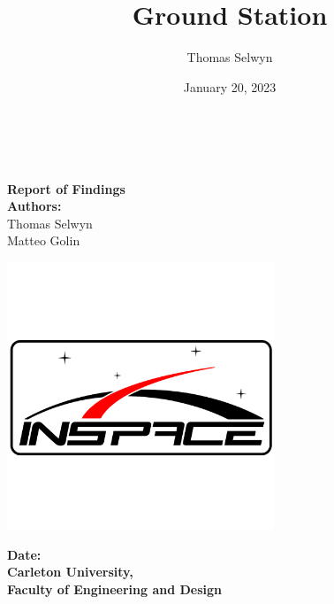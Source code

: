 \title{Ground Station}
\author{Thomas Selwyn}
\date{January 20, 2023}

\makeatletter
    \begin{titlepage}
        \begin{center}
        {}
        {\fontsize{34}{50}\selectfont \bf \@title}\\ 
	    {\ \\}
        \vbox{}\vspace{5cm}
            \centering
            {\bf\Large Report of Findings}\\[3cm] 
            {\large \textbf{Authors:}\\}
            {\large Thomas Selwyn\\}
            {\large Matteo Golin\\}
            \begin{center}
                \includegraphics[width=8cm]{images/cuinspace_logo.png}
            \end{center}
            {\large \textbf{Date:} \@date\\}
            {\large \textbf{Carleton University,}\\}
            {\large \textbf{Faculty of Engineering and Design}\\}
        \end{center}
    \end{titlepage}
\makeatother